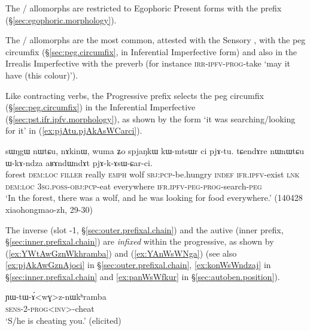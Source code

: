 The / allomorphs are restricted to Egophoric Present forms with the prefix  (§\ref{sec:egophoric.morphology}).

The / allomorphs are the most common, attested with the Sensory \hbox{,} with the peg circumfix (§\ref{sec:peg.circumfix}, in Inferential Imperfective form) and also in the Irrealis Imperfective with the preverb  (for instance  \textsc{irr}-\textsc{ipfv}-\textsc{prog}-take `may it have (this colour)').

 Like contracting verbs, the Progressive prefix selects the peg circumfix  (§\ref{sec:peg.circumfix}) in the Inferential Imperfective (§\ref{sec:pst.ifr.ipfv.morphology}), as shown by the form  `it was searching/looking for it' in (\ref{ex:pjAtu.pjAkAsWCarci}).

\begin{exe}
\ex \label{ex:pjAtu.pjAkAsWCarci}
\gll sɯŋgɯ nɯtɕu, nɤkinɯ, wuma ʑo spjaŋkɯ kɯ-mtsɯr ci pjɤ-tu. tɕendɤre nɯnɯtɕu ɯ-kɤ-ndza aʁɤndɯndɤt pjɤ-k-ɤsɯ-ɕar-ci. \\
forest \textsc{dem}:\textsc{loc} \textsc{filler} really \textsc{emph} wolf \textsc{sbj}:\textsc{pcp}-be.hungry \textsc{indef} \textsc{ifr}.\textsc{ipfv}-exist \textsc{lnk} \textsc{dem}:\textsc{loc} \textsc{3sg}.\textsc{poss}-\textsc{obj}:\textsc{pcp}-eat everywhere \textsc{ifr}.\textsc{ipfv}-\textsc{peg}-\textsc{prog}-search-\textsc{peg} \\
\glt `In the forest, there was a wolf, and he was looking for food everywhere.' (140428 xiaohongmao-zh, 29-30)
\end{exe}

The inverse (slot -1, §\ref{sec:outer.prefixal.chain}) and the autive (inner prefix, §\ref{sec:inner.prefixal.chain}) are \textit{infixed} within the progressive, as shown by (\ref{ex:YWtAwGznWkhramba}) and (\ref{ex:YAnWsWNga})  (see also \ref{ex:pjAkAwGznAjoci} in §\ref{sec:outer.prefixal.chain}, \ref{ex:konWsWndzaj} in §\ref{sec:inner.prefixal.chain} and \ref{ex:panWsWfkur} in §\ref{sec:autoben.position}). 
 
\begin{exe}
\ex \label{ex:YWtAwGznWkhramba}
\gll ɲɯ-tɯ-ɤ́<wɣ>z-nɯkʰramba \\
\textsc{sens}-2-\textsc{prog}<\textsc{inv}>-cheat \\
\glt `S/he is cheating you.' (elicited)
\end{exe} 
 
